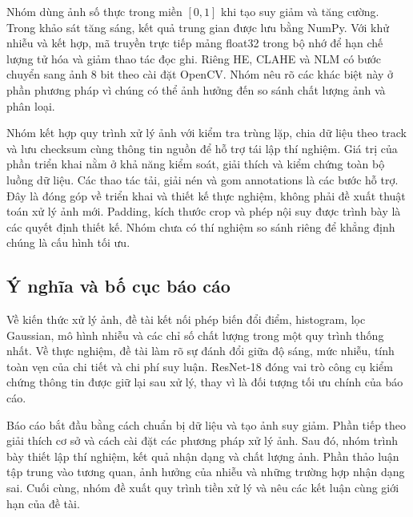 Nhóm dùng ảnh số thực trong miền $[0,1]$ khi tạo suy giảm và tăng cường. Trong khảo sát tăng sáng, kết quả trung gian được lưu bằng NumPy. Với khử nhiễu và kết hợp, mã truyền trực tiếp mảng float32 trong bộ nhớ để hạn chế lượng tử hóa và giảm thao tác đọc ghi. Riêng HE, CLAHE và NLM có bước chuyển sang ảnh 8 bit theo cài đặt OpenCV. Nhóm nêu rõ các khác biệt này ở phần phương pháp vì chúng có thể ảnh hưởng đến so sánh chất lượng ảnh và phân loại.

Nhóm kết hợp quy trình xử lý ảnh với kiểm tra trùng lặp, chia dữ liệu theo track và lưu checksum cùng thông tin nguồn để hỗ trợ tái lập thí nghiệm. Giá trị của phần triển khai nằm ở khả năng kiểm soát, giải thích và kiểm chứng toàn bộ luồng dữ liệu. Các thao tác tải, giải nén và gom annotations là các bước hỗ trợ. Đây là đóng góp về triển khai và thiết kế thực nghiệm, không phải đề xuất thuật toán xử lý ảnh mới. Padding, kích thước crop và phép nội suy được trình bày là các quyết định thiết kế. Nhóm chưa có thí nghiệm so sánh riêng để khẳng định chúng là cấu hình tối ưu.

\subsection{Ý nghĩa và bố cục báo cáo}
Về kiến thức xử lý ảnh, đề tài kết nối phép biến đổi điểm, histogram, lọc Gaussian, mô hình nhiễu và các chỉ số chất lượng trong một quy trình thống nhất. Về thực nghiệm, đề tài làm rõ sự đánh đổi giữa độ sáng, mức nhiễu, tính toàn vẹn của chi tiết và chi phí suy luận. ResNet-18 đóng vai trò công cụ kiểm chứng thông tin được giữ lại sau xử lý, thay vì là đối tượng tối ưu chính của báo cáo.

Báo cáo bắt đầu bằng cách chuẩn bị dữ liệu và tạo ảnh suy giảm. Phần tiếp theo giải thích cơ sở và cách cài đặt các phương pháp xử lý ảnh. Sau đó, nhóm trình bày thiết lập thí nghiệm, kết quả nhận dạng và chất lượng ảnh. Phần thảo luận tập trung vào tương quan, ảnh hưởng của nhiễu và những trường hợp nhận dạng sai. Cuối cùng, nhóm đề xuất quy trình tiền xử lý và nêu các kết luận cùng giới hạn của đề tài.
